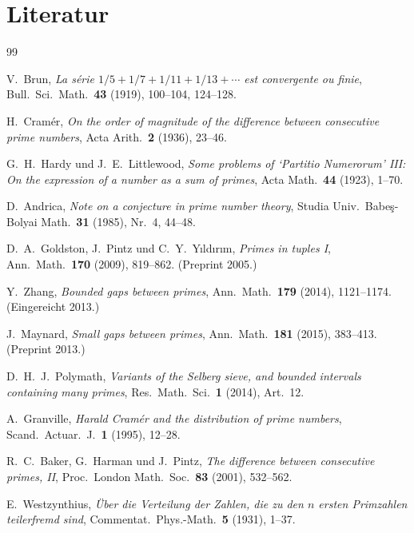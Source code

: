 \documentclass[12pt,a4paper]{amsart}
\theoremstyle{definition}
\begin{document}
\section*{Literatur}

\begin{thebibliography}{99}

V.\ Brun,
\textit{La s\'{e}rie $1/5 + 1/7 + 1/11 + 1/13 + \cdots$ est convergente ou finie},
Bull.\ Sci.\ Math.\ \textbf{43} (1919), 100--104, 124--128.

H.\ Cram\'{e}r,
\textit{On the order of magnitude of the difference between consecutive prime
numbers},
Acta Arith.\ \textbf{2} (1936), 23--46.

G.\ H.\ Hardy und J.\ E.\ Littlewood,
\textit{Some problems of `Partitio Numerorum' III: On the expression of a number
as a sum of primes},
Acta Math.\ \textbf{44} (1923), 1--70.

D.\ Andrica,
\textit{Note on a conjecture in prime number theory},
Studia Univ.\ Babe\c{s}-Bolyai Math.\ \textbf{31} (1985), Nr.\ 4, 44--48.

D.\ A.\ Goldston, J.\ Pintz und C.\ Y.\ Y{\i}ld{\i}r{\i}m,
\textit{Primes in tuples I},
Ann.\ Math.\ \textbf{170} (2009), 819--862. (Preprint 2005.)

Y.\ Zhang,
\textit{Bounded gaps between primes},
Ann.\ Math.\ \textbf{179} (2014), 1121--1174. (Eingereicht 2013.)

J.\ Maynard,
\textit{Small gaps between primes},
Ann.\ Math.\ \textbf{181} (2015), 383--413. (Preprint 2013.)

D.\ H.\ J.\ Polymath,
\textit{Variants of the Selberg sieve, and bounded intervals containing many
primes},
Res.\ Math.\ Sci.\ \textbf{1} (2014), Art.\ 12.

A.\ Granville,
\textit{Harald Cram\'{e}r and the distribution of prime numbers},
Scand.\ Actuar.\ J.\ \textbf{1} (1995), 12--28.

R.\ C.\ Baker, G.\ Harman und J.\ Pintz,
\textit{The difference between consecutive primes, II},
Proc.\ London Math.\ Soc.\ \textbf{83} (2001), 532--562.

E.\ Westzynthius,
\textit{\"{U}ber die Verteilung der Zahlen, die zu den $n$ ersten Primzahlen
teilerfremd sind},
Commentat.\ Phys.-Math.\ \textbf{5} (1931), 1--37.

\end{thebibliography}
\end{document}
